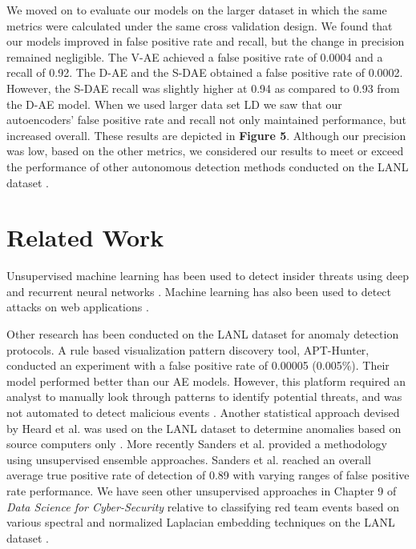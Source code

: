 \documentclass[sigconf]{acmart}
\begin{document}
We moved on to evaluate our models on the larger dataset in which the same metrics were calculated under the same cross validation design. We found that our models improved in false positive rate and recall, but the change in precision remained negligible. The V-AE achieved a false positive rate of 0.0004 and a recall of 0.92. The D-AE and the S-DAE obtained a false positive rate of 0.0002. However, the S-DAE recall was slightly higher at 0.94 as compared to 0.93 from the D-AE model. When we used larger data set LD we saw that our autoencoders' false positive rate and recall not only maintained performance, but increased overall. These results are depicted in \textbf{Figure 5}.  Although our precision was low, based on the other metrics, we considered our results to meet or exceed the performance of other autonomous detection methods conducted on the LANL dataset \cite{HEARD2, BOHARA}. 


\section{Related Work}
Unsupervised machine learning has been used to detect insider threats using deep and recurrent neural networks \cite{TUOR}.  Machine learning has also been used to detect attacks on web applications \cite{CHORAS}.

Other research has been conducted on the LANL dataset for anomaly detection protocols. A rule based visualization pattern discovery tool, APT-Hunter, conducted an experiment with a false positive rate of 0.00005 (0.005\%). Their model performed better than our AE models.  However, this platform required an analyst to manually look through patterns to identify potential threats, and was not automated to detect malicious events \cite{SIADATI}.  Another statistical approach devised by Heard et al. was used on the
LANL dataset to determine anomalies based on source computers only \cite{HEARD}.  More recently Sanders et al. \cite{BOHARA} provided a methodology using unsupervised ensemble approaches. Sanders et al. reached an overall average true positive
rate of detection of 0.89 with varying ranges of false positive rate performance. We have seen other unsupervised approaches in Chapter 9 of \textit{Data Science for Cyber-Security} relative to classifying red team events based on various spectral and normalized Laplacian embedding techniques on the LANL dataset \cite{HEARD2}.
\end{document}
